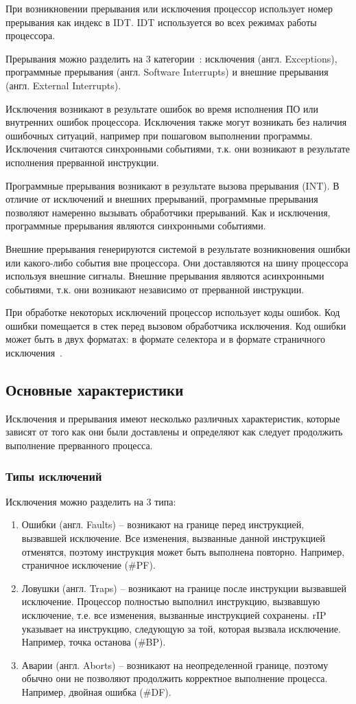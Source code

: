 При возникновении прерывания или исключения процессор использует номер
прерывания как индекс в IDT. IDT используется во всех режимах работы процессора.

Прерывания можно разделить на 3 категории~\cite{amd_pm_v2}: исключения (англ. Exceptions),
программные прерывания (англ. Software Interrupts) и внешние прерывания (англ. External Interrupts).

Исключения возникают в результате ошибок во время исполнения ПО или внутренних
ошибок процессора. Исключения также могут возникать без наличия ошибочных
ситуаций, например при пошаговом выполнении программы. Исключения считаются
синхронными событиями, т.к. они возникают в результате исполнения прерванной
инструкции.

Программные прерывания возникают в результате вызова прерывания (INT). В
отличие от исключений и внешних прерываний, программные прерывания позволяют
намеренно вызывать обработчики прерываний. Как и исключения, программные
прерывания являются синхронными событиями.

Внешние прерывания генерируются системой в результате возникновения ошибки
или какого-либо события вне процессора. Они доставляются на шину процессора
используя внешние сигналы. Внешние прерывания являются асинхронными событиями,
т.к. они возникают независимо от прерванной инструкции.

При обработке некоторых исключений процессор использует коды ошибок. Код
ошибки помещается в стек перед вызовом обработчика исключения. Код ошибки
может быть в двух форматах: в формате селектора и в формате
страничного исключения~\cite{amd_pm_v2}.


\subsection{Основные характеристики}
Исключения и прерывания имеют несколько различных характеристик, которые
зависят от того как они были доставлены и определяют как следует продолжить выполнение
прерванного процесса.

\subsubsection*{Типы исключений}
Исключения можно разделить на 3 типа:
\begin{enumerate}[1.]
\item Ошибки (англ. Faults) -- возникают на границе перед
инструкцией, вызвавшей исключение. Все изменения, вызванные данной инструкцией
отменятся, поэтому инструкция может быть выполнена повторно. Например,
страничное исключение (\#PF).
\item Ловушки (англ. Traps) -- возникают на границе после
инструкции вызвавшей исключение. Процессор полностью выполнил инструкцию,
вызвавшую исключение, т.е. все изменения, вызванные инструкцией сохранены.
rIP указывает на инструкцию, следующую за той, которая вызвала исключение.
Например, точка останова (\#BP).
\item Аварии (англ. Aborts) -- возникают на неопределенной границе,
поэтому обычно они не позволяют продолжить корректное выполнение процесса.
Например, двойная ошибка (\#DF).
\end{enumerate}


